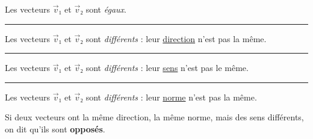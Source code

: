 \documentclass[
	classe=$2^{de}$,
	headerTitle=Généralités\space sur\space les\space vecteurs
]{coursclass}
\begin{document}
\begin{exemple}
	\begin{multicols}{2}

		\columnbreak

		Les vecteurs $\vec{v}₁$ et $\vec{v}₂$ sont \textit{égaux}.
	\end{multicols}
	\hrule

	\begin{multicols}{2}

		\columnbreak

		Les vecteurs $\vec{v}₁$ et $\vec{v}₂$ sont \textit{différents} : leur \uline{direction} n'est pas la même.
	\end{multicols}
	\hrule

	\begin{multicols}{2}

		\columnbreak

		Les vecteurs $\vec{v}₁$ et $\vec{v}₂$ sont \textit{différents} : leur \uline{sens} n'est pas le même.
	\end{multicols}
	\hrule

	\begin{multicols}{2}

		\columnbreak

		Les vecteurs $\vec{v}₁$ et $\vec{v}₂$ sont \textit{différents} : leur \uline{norme} n'est pas la même.
	\end{multicols}
\end{exemple}

\begin{definition}
	Si deux vecteurs ont la même direction, la même norme, mais des sens différents, on dit qu'ils sont \textbf{opposés}.
\end{definition}
\end{document}
